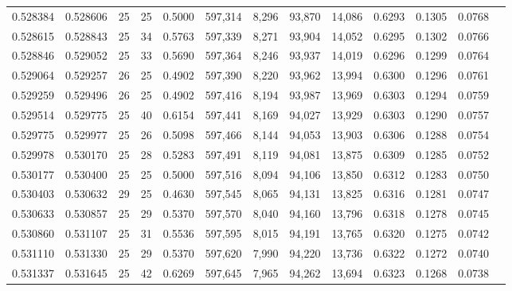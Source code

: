 \begin{tabular}{rrrrrrrrrrrrr}
0.528384 & 0.528606 &    25 &  25 &                                     0.5000 & 597,314 &   8,296 &  93,870 &  14,086 & 0.6293 & 0.1305 & 0.0768 \\
0.528615 & 0.528843 &    25 &  34 &                                     0.5763 & 597,339 &   8,271 &  93,904 &  14,052 & 0.6295 & 0.1302 & 0.0766 \\
0.528846 & 0.529052 &    25 &  33 &                                     0.5690 & 597,364 &   8,246 &  93,937 &  14,019 & 0.6296 & 0.1299 & 0.0764 \\
0.529064 & 0.529257 &    26 &  25 &                                     0.4902 & 597,390 &   8,220 &  93,962 &  13,994 & 0.6300 & 0.1296 & 0.0761 \\
0.529259 & 0.529496 &    26 &  25 &                                     0.4902 & 597,416 &   8,194 &  93,987 &  13,969 & 0.6303 & 0.1294 & 0.0759 \\
0.529514 & 0.529775 &    25 &  40 &                                     0.6154 & 597,441 &   8,169 &  94,027 &  13,929 & 0.6303 & 0.1290 & 0.0757 \\
0.529775 & 0.529977 &    25 &  26 &                                     0.5098 & 597,466 &   8,144 &  94,053 &  13,903 & 0.6306 & 0.1288 & 0.0754 \\
0.529978 & 0.530170 &    25 &  28 &                                     0.5283 & 597,491 &   8,119 &  94,081 &  13,875 & 0.6309 & 0.1285 & 0.0752 \\
0.530177 & 0.530400 &    25 &  25 &                                     0.5000 & 597,516 &   8,094 &  94,106 &  13,850 & 0.6312 & 0.1283 & 0.0750 \\
0.530403 & 0.530632 &    29 &  25 &                                     0.4630 & 597,545 &   8,065 &  94,131 &  13,825 & 0.6316 & 0.1281 & 0.0747 \\
0.530633 & 0.530857 &    25 &  29 &                                     0.5370 & 597,570 &   8,040 &  94,160 &  13,796 & 0.6318 & 0.1278 & 0.0745 \\
0.530860 & 0.531107 &    25 &  31 &                                     0.5536 & 597,595 &   8,015 &  94,191 &  13,765 & 0.6320 & 0.1275 & 0.0742 \\
0.531110 & 0.531330 &    25 &  29 &                                     0.5370 & 597,620 &   7,990 &  94,220 &  13,736 & 0.6322 & 0.1272 & 0.0740 \\
0.531337 & 0.531645 &    25 &  42 &                                     0.6269 & 597,645 &   7,965 &  94,262 &  13,694 & 0.6323 & 0.1268 & 0.0738 \\

\end{tabular}
